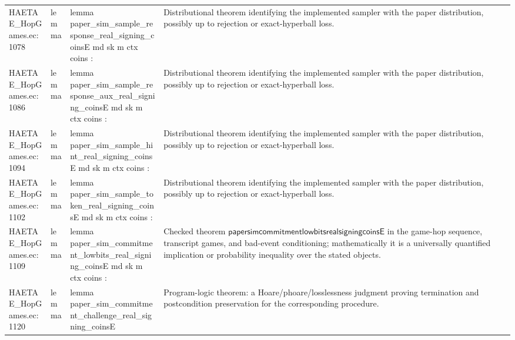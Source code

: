 \documentclass[10pt]{article}
\begin{document}
\begin{longtable}{L{0.11\textwidth}L{0.055\textwidth}L{0.385\textwidth}L{0.41\textwidth}}
HAETAE\_\allowbreak{}HopGames.\allowbreak{}ec:\allowbreak{}1078 & lemma & {\ttfamily\scriptsize lemma paper\_\allowbreak{}sim\_\allowbreak{}sample\_\allowbreak{}response\_\allowbreak{}real\_\allowbreak{}signing\_\allowbreak{}coinsE md sk m ctx coins :} & Distributional theorem identifying the implemented sampler with the paper distribution, possibly up to rejection or exact-hyperball loss. \\
HAETAE\_\allowbreak{}HopGames.\allowbreak{}ec:\allowbreak{}1086 & lemma & {\ttfamily\scriptsize lemma paper\_\allowbreak{}sim\_\allowbreak{}sample\_\allowbreak{}response\_\allowbreak{}aux\_\allowbreak{}real\_\allowbreak{}signing\_\allowbreak{}coinsE md sk m ctx coins :} & Distributional theorem identifying the implemented sampler with the paper distribution, possibly up to rejection or exact-hyperball loss. \\
HAETAE\_\allowbreak{}HopGames.\allowbreak{}ec:\allowbreak{}1094 & lemma & {\ttfamily\scriptsize lemma paper\_\allowbreak{}sim\_\allowbreak{}sample\_\allowbreak{}hint\_\allowbreak{}real\_\allowbreak{}signing\_\allowbreak{}coinsE md sk m ctx coins :} & Distributional theorem identifying the implemented sampler with the paper distribution, possibly up to rejection or exact-hyperball loss. \\
HAETAE\_\allowbreak{}HopGames.\allowbreak{}ec:\allowbreak{}1102 & lemma & {\ttfamily\scriptsize lemma paper\_\allowbreak{}sim\_\allowbreak{}sample\_\allowbreak{}token\_\allowbreak{}real\_\allowbreak{}signing\_\allowbreak{}coinsE md sk m ctx coins :} & Distributional theorem identifying the implemented sampler with the paper distribution, possibly up to rejection or exact-hyperball loss. \\
HAETAE\_\allowbreak{}HopGames.\allowbreak{}ec:\allowbreak{}1109 & lemma & {\ttfamily\scriptsize lemma paper\_\allowbreak{}sim\_\allowbreak{}commitment\_\allowbreak{}lowbits\_\allowbreak{}real\_\allowbreak{}signing\_\allowbreak{}coinsE md sk m ctx coins :} & Checked theorem $\mathsf{papersimcommitmentlowbitsrealsigningcoinsE}$ in the game-hop sequence, transcript games, and bad-event conditioning; mathematically it is a universally quantified implication or probability inequality over the stated objects. \\
HAETAE\_\allowbreak{}HopGames.\allowbreak{}ec:\allowbreak{}1120 & lemma & {\ttfamily\scriptsize lemma paper\_\allowbreak{}sim\_\allowbreak{}commitment\_\allowbreak{}challenge\_\allowbreak{}real\_\allowbreak{}signing\_\allowbreak{}coinsE} & Program-logic theorem: a Hoare/phoare/losslessness judgment proving termination and postcondition preservation for the corresponding procedure. \\

\end{longtable}
\end{document}
